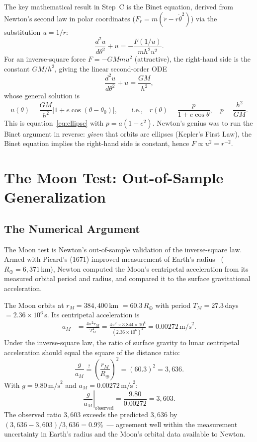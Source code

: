 \documentclass[12pt]{article}
\begin{document}
The key mathematical result in Step~C is the Binet equation,
derived from Newton's second law in polar coordinates
($F_{r}=m(\ddot r - r\dot\theta^{2})$) via the substitution $u=1/r$:
\begin{equation}\label{eq:binet}
  \frac{d^{2}u}{d\theta^{2}} + u = -\frac{F(1/u)}{mh^{2}u^{2}}.
\end{equation}
For an inverse-square force $F=-GMmu^{2}$ (attractive), the right-hand side
is the constant $GM/h^{2}$, giving the linear second-order ODE
\[
  \frac{d^{2}u}{d\theta^{2}} + u = \frac{GM}{h^{2}},
\]
whose general solution is
\[
  u(\theta) = \frac{GM}{h^{2}}\bigl[1 + e\cos(\theta-\theta_{0})\bigr],
  \qquad\text{i.e.,}\quad
  r(\theta) = \frac{p}{1+e\cos\theta},\quad
  p = \frac{h^{2}}{GM}.
\]
This is equation~\eqref{eq:ellipse} with $p=a(1-e^{2})$.
Newton's genius was to run the Binet argument in reverse: \emph{given} that
orbits are ellipses (Kepler's First Law), the Binet equation implies the
right-hand side is constant, hence $F\propto u^{2}=r^{-2}$.

\section{The Moon Test: Out-of-Sample Generalization}
\label{sec:moontest}

\subsection{The Numerical Argument}

The Moon test is Newton's out-of-sample validation of the inverse-square law.
Armed with Picard's (1671) improved measurement of Earth's
radius~\citep{Picard1671} ($R_\oplus = 6{,}371$\,km),
Newton computed the Moon's centripetal acceleration from its measured orbital
period and radius, and compared it to the surface gravitational acceleration.

The Moon orbits at $r_{M}=384{,}400$\,km $=60.3\,R_\oplus$ with
period $T_{M}=27.3$\,days $=2{.}36\times10^{6}$\,s.
Its centripetal acceleration is
\begin{align}
  a_{M} &= \frac{4\pi^{2}r_{M}}{T_{M}^{2}}
          = \frac{4\pi^{2}\times3{.}844\times10^{8}}{(2{.}36\times10^{6})^{2}}
          = 0{.}00272\,\text{m/s}^{2}.\label{eq:amoon}
\end{align}
Under the inverse-square law, the ratio of surface gravity to lunar centripetal
acceleration should equal the square of the distance ratio:
\[
  \frac{g}{a_{M}} \overset{?}{=} \left(\frac{r_{M}}{R_\oplus}\right)^{2}
  = (60.3)^{2} = 3{,}636.
\]
With $g=9.80\,\text{m/s}^{2}$ and $a_{M}=0.00272\,\text{m/s}^{2}$:
\[
  \left.\frac{g}{a_{M}}\right|_{\text{observed}}
  = \frac{9.80}{0.00272} = 3{,}603.
\]
The observed ratio $3{,}603$ exceeds the predicted $3{,}636$ by
$(3{,}636-3{,}603)/3{,}636=0.9\%$~---
agreement well within the measurement uncertainty in Earth's radius
and the Moon's orbital data available to Newton.
\end{document}
